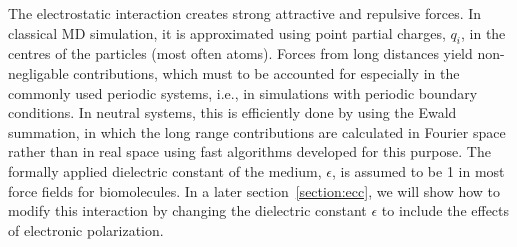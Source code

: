 
The electrostatic interaction creates strong attractive and repulsive forces. 
In classical MD simulation, it is approximated using point partial charges, $q_i$, in the centres of the particles (most often atoms). 
Forces from long distances yield non-negligable contributions,
which must to be accounted for especially in the commonly used 
periodic systems, i.e., in simulations with periodic boundary conditions. 
In neutral systems, this is efficiently done by using the Ewald summation,
in which the long range contributions are calculated in Fourier space rather than in real space
using fast algorithms developed for this purpose. \citep{darden93, essman95}
The formally applied dielectric constant of the medium, $\epsilon$,  
is assumed to be 1 in most force fields for biomolecules. 
In a later section~\ref{section:ecc}, we will show how to modify this interaction 
by changing the dielectric constant $\epsilon$ to include the effects of electronic polarization. 



